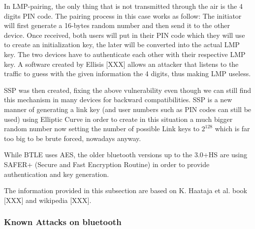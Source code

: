 In LMP-pairing, the only thing that is not transmitted through the air is the 4 digits PIN code. The pairing process in this case works as follow:
The initiator will first generate a 16-bytes random number and then send it to the other device. Once received, both users will put in their PIN code which they will use to create an initialization key, the later will be converted into the actual LMP key. The two devices have to authenticate each other with their respective LMP key. 
A software created by Ellisis [XXX] allows an attacker that listens to the traffic to guess with the given information the 4 digits, thus making LMP useless. 

SSP was then created, fixing the above vulnerability even though we can still find this mechanism in many devices for backward compatibilities.
SSP is a new manner of generating a link key (and user numbers such as PIN codes can still be used) using Elliptic Curve in order to create in this situation a much bigger random number now setting the number of possible Link keys to \(2^{128}\) which is far too big to be brute forced, nowadays anyway. 



 
While BTLE uses AES, the older bluetooth versions up to the 3.0+HS are using SAFER+ (Secure and Fast Encryption Routine) in order to provide authentication and key generation.


The information provided in this subsection are based on K. Haataja et al. book [XXX] and wikipedia [XXX].

\subsubsection{Known Attacks on bluetooth}
















